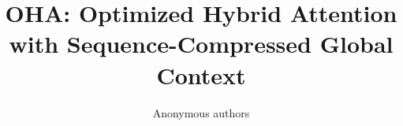 \title{\textbf{OHA: Optimized Hybrid Attention with Sequence-Compressed Global Context}}

\author{Anonymous authors}
